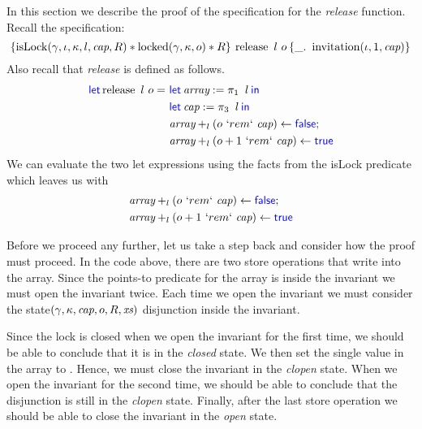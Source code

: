 In this section we describe the proof of the specification for the
\textit{release} function. Recall the specification:
\[
\hoare{ \isLock(\gamma, \iota, \kappa, l, \Cap, R) \ast \locked(\gamma, \kappa, o) \ast R }
      { \release\ l\ o }
      { \_.\ \invitation(\iota, 1, \Cap) }
\]
Also recall that \textit{release} is defined as follows.
\begin{align*}
  \langkw{let} \release\ l\ o =\ & \Let \Array = \Proj1\ l in \\
                                 & \Let \Cap = \Proj{3}\ l in \\
                                 & \Array \plusl (o\ `rem`\ \Cap) \gets \False ; \\
                                 & \Array \plusl (o + 1\ `rem`\ \Cap) \gets \True
\end{align*}
We can evaluate the two let expressions using the facts from the isLock
predicate which leaves us with
\begin{align*}
  & \textit{array} +_{l} (o\ `rem`\ \textit{cap}) \leftarrow \textsf{\color{blue} false} ; \\
  & \textit{array} +_{l} (o + 1\ `rem`\ \textit{cap}) \leftarrow \textsf{\color{blue} true}
\end{align*}

Before we proceed any further, let us take a step back and consider how the proof
must proceed. In the code above, there are two store operations that write into
the array. Since the points-to predicate for the array is inside the invariant
we must open the invariant twice. Each time we open the invariant we must
consider the state$(\gamma, \kappa, \textit{cap}, o, R, \textit{xs})$ disjunction inside the
invariant.

Since the lock is closed when we open the invariant for the first time, we
should be able to conclude that it is in the \textit{closed} state. We then set
the single \True{} value in the array to \False. Hence, we must close the
invariant in the \textit{clopen} state. When we open the invariant for the
second time, we should be able to conclude that the disjunction is still in the
\textit{clopen} state. Finally, after the last store operation we should be able
to close the invariant in the \textit{open} state.

